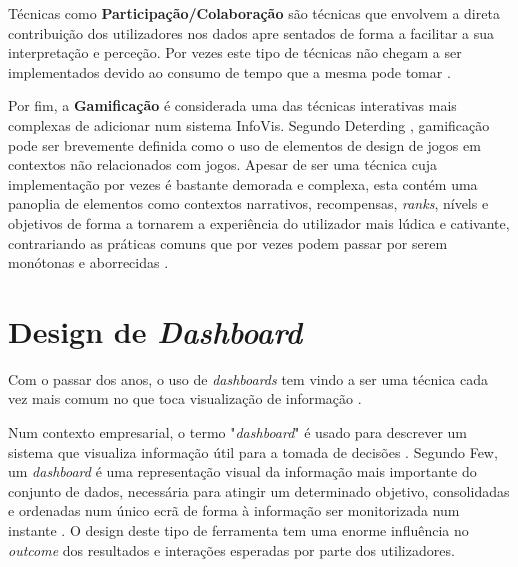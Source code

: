 Técnicas como \textbf{Participação/Colaboração} são técnicas que envolvem a direta contribuição dos utilizadores nos dados apre sentados de forma a facilitar a sua interpretação e perceção. Por vezes este tipo de técnicas não chegam a ser implementados devido ao consumo de tempo que a mesma pode tomar \cite{figueiras2015towards}. 

Por fim, a \textbf{Gamificação} é considerada uma das técnicas interativas mais complexas de adicionar num sistema \gls{InfoVis}. Segundo Deterding \cite{deterding2011game}, gamificação pode ser brevemente definida como o uso de elementos de design de jogos em contextos não relacionados com jogos. Apesar de ser uma técnica cuja implementação por vezes é bastante demorada e complexa, esta contém uma panoplia de elementos como contextos narrativos, recompensas, \textit{ranks}, nívels e objetivos de forma a tornarem a experiência do utilizador mais lúdica e cativante, contrariando as práticas comuns que por vezes podem passar por serem monótonas e aborrecidas \cite{figueiras2015towards}.

\section{Design de \textit{Dashboard}}
\label{sec:design_dashboard}

Com o passar dos anos, o uso de \textit{dashboards} tem vindo a ser uma técnica cada vez mais comum no que toca visualização de informação \cite{sarikaya2018we}. 

Num contexto empresarial, o termo "\textit{dashboard}" é usado para descrever um sistema que visualiza informação útil para a tomada de decisões \cite{janes2013effective}. Segundo Few, um \textit{dashboard} é uma representação visual da informação mais importante do conjunto de dados, necessária para atingir um determinado objetivo, consolidadas e ordenadas num único ecrã de forma à informação ser monitorizada num instante \cite{few2005common}. O design deste tipo de ferramenta tem uma enorme influência no \textit{outcome} dos resultados e interações esperadas por parte dos utilizadores. 

